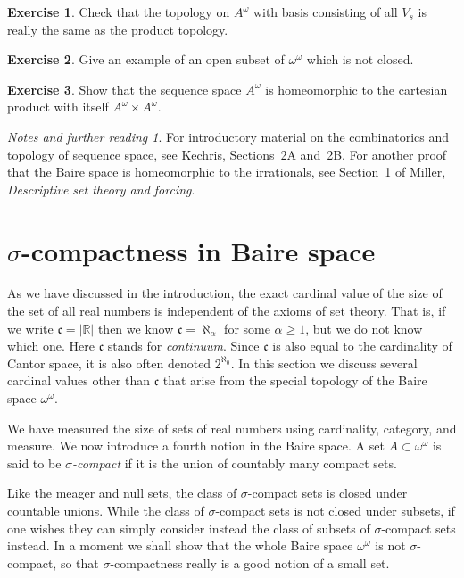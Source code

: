 \documentclass[11pt,oneside]{amsbook}
\newcommand{\RR}{\mathbb R}
\theoremstyle{definition}
\newtheorem{exerc}{Exercise}[section]
\theoremstyle{plain}
\theoremstyle{definition}
\theoremstyle{remark}
\newtheorem*{notes}{Notes and further reading}
\begin{document}
\begin{exerc}
  Check that the topology on $A^\omega$ with basis consisting of all $V_s$ is really the same as the product topology.
\end{exerc}

\begin{exerc}
  Give an example of an open subset of $\omega^\omega$ which is not closed.
\end{exerc}

\begin{exerc}
  Show that the sequence space $A^\omega$ is homeomorphic to the cartesian product with itself $A^\omega\times A^\omega$.
\end{exerc}

\begin{notes}
  For introductory material on the combinatorics and topology of sequence space, see Kechris, Sections~2A and~2B. For another proof that the Baire space is homeomorphic to the irrationals, see Section~1 of Miller, \emph{Descriptive set theory and forcing}.
\end{notes}



\section{$\sigma$-compactness in Baire space}

As we have discussed in the introduction, the exact cardinal value of the size of the set of all real numbers is independent of the axioms of set theory. That is, if we write $\mathfrak c=|\RR|$ then we know $\mathfrak c=\aleph_\alpha$ for some $\alpha\geq1$, but we do not know which one. Here $\mathfrak c$ stands for \emph{continuum}. Since $\mathfrak c$ is also equal to the cardinality of Cantor space, it is also often denoted $2^{\aleph_0}$. In this section we discuss several cardinal values other than $\mathfrak c$ that arise from the special topology of the Baire space $\omega^\omega$.

We have measured the size of sets of real numbers using cardinality, category, and measure. We now introduce a fourth notion in the Baire space. A set $A\subset\omega^\omega$ is said to be \emph{$\sigma$-compact} if it is the union of countably many compact sets.

Like the meager and null sets, the class of $\sigma$-compact sets is closed under countable unions. While the class of $\sigma$-compact sets is not closed under subsets, if one wishes they can simply consider instead the class of subsets of $\sigma$-compact sets instead. In a moment we shall show that the whole Baire space $\omega^\omega$ is not $\sigma$-compact, so that $\sigma$-compactness really is a good notion of a small set.
\end{document}
